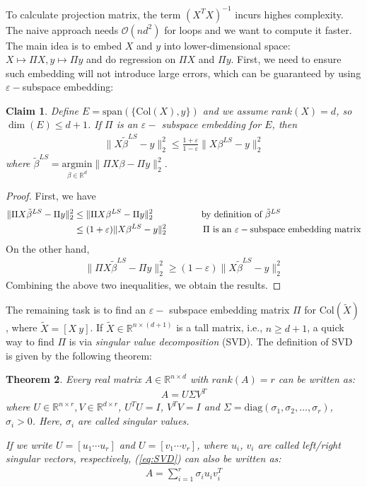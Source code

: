 \documentclass[11pt]{article}
\newcommand{\eps}{\varepsilon}
\newtheorem{theorem}{Theorem}
\newtheorem{claim}[theorem]{Claim}
\begin{document}
To calculate projection matrix, the term $(X^TX)^{-1}$ incurs highes complexity. The naive approach needs $\mathcal{O}(nd^2)$ for loops and we want to compute it faster. The main idea is to embed $X$ and $y$ into lower-dimensional space: $X\mapsto \Pi X,y\mapsto \Pi y$ and do regression on $\Pi X$ and $\Pi y$. First, we need to ensure such embedding will not introduce large errors, which can be guaranteed by using $\eps-$subspace embedding:
\begin{claim}
Define $E=\text{span}(\{\text{Col}(X),y\})$ and we assume $rank(X)=d$, so $\dim(E)\leq d+1$. If $\Pi$ is an $\eps-$ subspace embedding for $E$, then
\begin{align*}
\|X\tilde{\beta}^{LS}-y\|_2^2 \leq \frac{1+\eps}{1-\eps}\|X{\beta}^{LS}-y\|_2^2
\end{align*}
where $\tilde{\beta}^{LS} = \underset{\beta\in\mathbb{R}^d}{\text{argmin}}\|\Pi X\beta - \Pi y\|_2^2$.
\end{claim}
\begin{proof}
First, we have
\begin{align*}
\|\Pi X\tilde{\beta}^{LS}-\Pi y\|_2^2 &\leq \|\Pi X{\beta}^{LS}-\Pi y\|_2^2 \hspace{5.3em} \text{by definition of }\tilde{\beta}^{LS}\\
&\leq (1+\eps)\|X{\beta}^{LS}-y\|_2^2 \hspace{4em} \Pi\text{ is an }\eps-\text{subspace embedding matrix}
\end{align*}
On the other hand,
\begin{align*}
\|\Pi X\tilde{\beta}^{LS}-\Pi y\|_2^2 \geq (1-\eps)\|X\tilde{\beta}^{LS}-y\|_2^2
\end{align*}
Combining the above two inequalities, we obtain the results.
\end{proof}
The remaining task is to find an $\eps-$ subspace embedding matrix $\Pi$ for $\text{Col}(\widetilde{X})$, where $\widetilde{X} = [X~y]$. If $\widetilde{X}\in \mathbb{R}^{n\times (d+1)}$ is a tall matrix, i.e., $n\geq d+1$, a quick way to find $\Pi$ is via \emph{singular value decomposition} (SVD). The definition of SVD is given by the following theorem:
\begin{theorem}
\label{thm:svd}
Every real matrix $A\in \mathbb{R}^{n\times d}$ with $rank(A)=r$ can be written as:
\begin{align}
\label{eq:SVD}
A = U\Sigma V^T
\end{align}
where $U\in \mathbb{R}^{n\times r}, V\in \mathbb{R}^{d\times r}$, $U^T U=I$, $V^T V=I$ and $\Sigma = \text{diag}(\sigma_1,\sigma_2,\ldots,\sigma_r)$, $\sigma_i>0$. Here, $\sigma_i$ are called singular values.

If we write $U = [u_1 \cdots u_r]$ and $U = [v_1 \cdots v_r]$, where $u_i$, $v_i$ are called left/right singular vectors, respectively, (\ref{eq:SVD}) can also be written as:
\begin{align}
\label{eq:SVD1}
A = \sum_{i=1}^r \sigma_i u_iv_i^T
\end{align}
\end{theorem}
\end{document}
